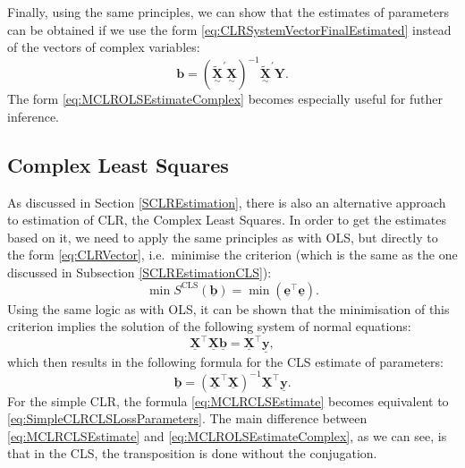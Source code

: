 \documentclass[
]{book}
\begin{document}
Finally, using the same principles, we can show that the estimates of parameters can be obtained if we use the form \eqref{eq:CLRSystemVectorFinalEstimated} instead of the vectors of complex variables:
\begin{equation}
    \boldsymbol{b} = \left( \underset{\sim}{\mathbf{\tilde{X}}}^\prime \underset{\sim}{\mathbf{X}}\right)^{-1} \underset{\sim}{\mathbf{\tilde{X}}}^\prime {\mathbf{Y}} .
    \label{eq:MCLROLSEstimateComplex}
\end{equation}
The form \eqref{eq:MCLROLSEstimateComplex} becomes especially useful for futher inference.

\hypertarget{complex-least-squares}{%
\subsection{Complex Least Squares}\label{complex-least-squares}}

As discussed in Section \ref{SCLREstimation}, there is also an alternative approach to estimation of CLR, the Complex Least Squares. In order to get the estimates based on it, we need to apply the same principles as with OLS, but directly to the form \eqref{eq:CLRVector}, i.e.~minimise the criterion (which is the same as the one discussed in Subsection \ref{SCLREstimationCLS}):
\begin{equation}
    \min S^{\mathrm{CLS}}(\underline{\boldsymbol{b}}) = \min \left(\underline{\mathbf{e}}^\top \underline{\mathbf{e}}\right).
    \label{eq:CLRCLSCriterion}
\end{equation}
Using the same logic as with OLS, it can be shown that the minimisation of this criterion implies the solution of the following system of normal equations:
\begin{equation}
    \underline{\mathbf{X}}^\top \underline{\mathbf{X}} \underline{\boldsymbol{b}} = \underline{\mathbf{X}}^\top \underline{\mathbf{y}} ,
    \label{eq:CLRCLSSystemOfNormalEquations}
\end{equation}
which then results in the following formula for the CLS estimate of parameters:
\begin{equation}
    \underline{\boldsymbol{b}} = \left( \underline{\mathbf{X}}^\top \underline{\mathbf{X}}\right)^{-1} \underline{\mathbf{X}}^\top \underline{\mathbf{y}} .
    \label{eq:MCLRCLSEstimate}
\end{equation}
For the simple CLR, the formula \eqref{eq:MCLRCLSEstimate} becomes equivalent to \eqref{eq:SimpleCLRCLSLossParameters}. The main difference between \eqref{eq:MCLRCLSEstimate} and \eqref{eq:MCLROLSEstimateComplex}, as we can see, is that in the CLS, the transposition is done without the conjugation.
\end{document}

